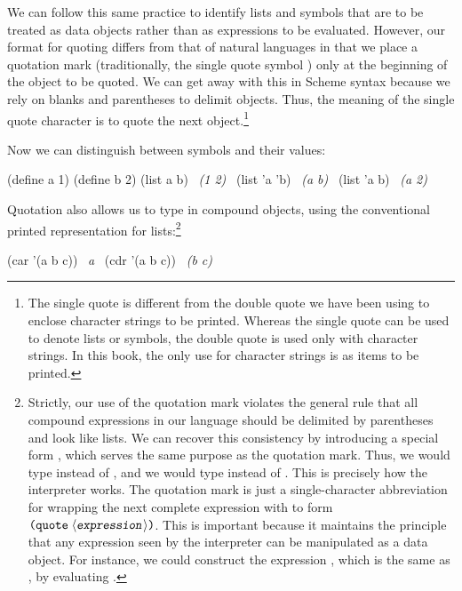 We can follow this same practice to identify lists and symbols that are to be
treated as data objects rather than as expressions to be evaluated.  However,
our format for quoting differs from that of natural languages in that we place
a quotation mark (traditionally, the single quote symbol ) only at the
beginning of the object to be quoted.  We can get away with this in Scheme
syntax because we rely on blanks and parentheses to delimit objects.  Thus, the
meaning of the single quote character is to quote the next object.\footnote{The
single quote is different from the double quote we have been using to enclose
character strings to be printed.  Whereas the single quote can be used to
denote lists or symbols, the double quote is used only with character strings.
In this book, the only use for character strings is as items to be printed.}

Now we can distinguish between symbols and their values:

\begin{codeBlock}
(define a 1)
(define b 2)
(list a b)
~\textit{(1 2)}~
(list 'a 'b)
~\textit{(a b)}~
(list 'a b)
~\textit{(a 2)}~
\end{codeBlock}

\noindent
Quotation also allows us to type in compound objects, using the conventional
printed representation for lists:\footnote{Strictly, our use of the quotation
mark violates the general rule that all compound expressions in our language
should be delimited by parentheses and look like lists. We can recover this
consistency by introducing a special form , which serves the same
purpose as the quotation mark. Thus, we would type  instead of
, and we would type  instead of .
This is precisely how the interpreter works. The quotation mark is just a
single-character abbreviation for wrapping the next complete expression with
 to form \( \text{\texttt{(quote}}\; \langle \text{\texttt{\textsl{expression}}} \rangle \text{\texttt{)}} \). This is
important because it maintains the principle that any expression seen by the
interpreter can be manipulated as a data object. For instance, we could
construct the expression , which is the same as , by evaluating .}

\begin{codeBlock}
(car '(a b c))
~\textit{a}~
(cdr '(a b c))
~\textit{(b c)}~
\end{codeBlock}

